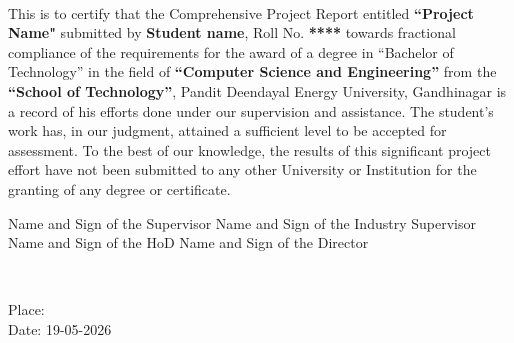 \begin{justify}
\vspace{-3cm}
\thispagestyle{plain}
\begin{center}
{\Large \color{black}{ \bf Certificate from the Project Supervisor/Head }} \\
\end{center}
\vspace{.2cm}
\begin{flushleft}
\begin{minipage}[b]{0.1\linewidth}
\end{minipage}
\end{flushleft} 
\vspace{-.1cm}


\vspace{-.4cm}

This is to certify that the Comprehensive Project Report entitled {\bf ``Project Name"} submitted by {\bf Student name}, Roll No. {\bf *****} towards fractional compliance of the requirements for the award of a degree in “Bachelor of Technology” in the field of {\bf “Computer Science and Engineering”} from the {\bf “School of Technology”}, Pandit Deendayal Energy University, Gandhinagar is a record of his efforts done under our supervision and assistance. The student's work has, in our judgment, attained a sufficient level to be accepted for assessment. To the best of our knowledge, the results of this significant project effort have not been submitted to any other University or Institution for the granting of any degree or certificate. 

\vspace{4cm}


\begin{center}
    Name and Sign of the Supervisor \hspace{1cm}Name and Sign of the Industry Supervisor\\
    \vspace{2cm}
    Name and Sign of the HoD\hspace{1.5cm} Name and Sign of the Director\\
\end{center}\\

\vspace{2cm}

\raggedright Place: \\

\vspace{1cm}
Date: 19-05-2026
\end{justify}

